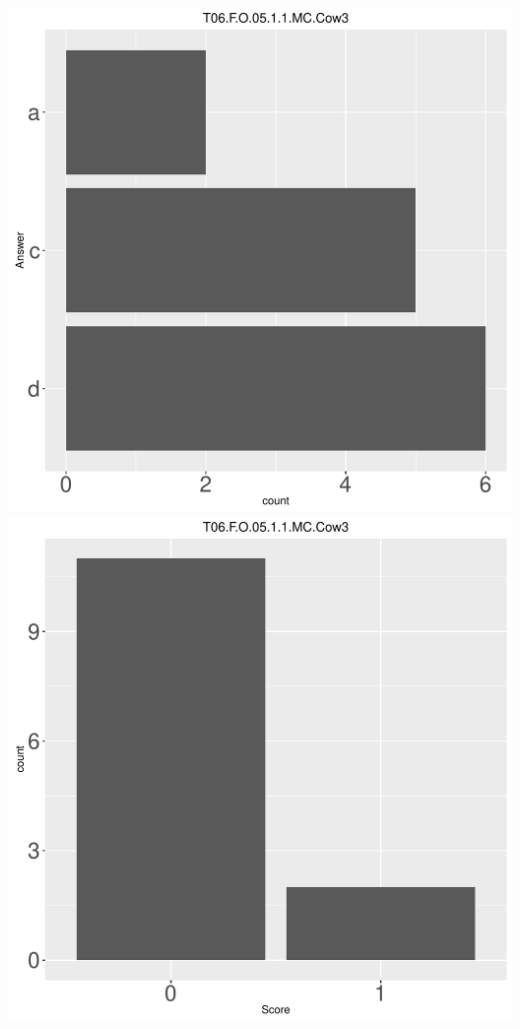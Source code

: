 \documentclass[12pt,english,nohyper]{tufte-handout}\usepackage[]{graphicx}\usepackage[]{color}
\begin{document}
\begin{center} \includegraphics[width=.45\linewidth]{Topic06_AB_59_answer} \includegraphics[width=.45\linewidth]{Topic06_AB_59_score} \end{center} 
\end{document}
